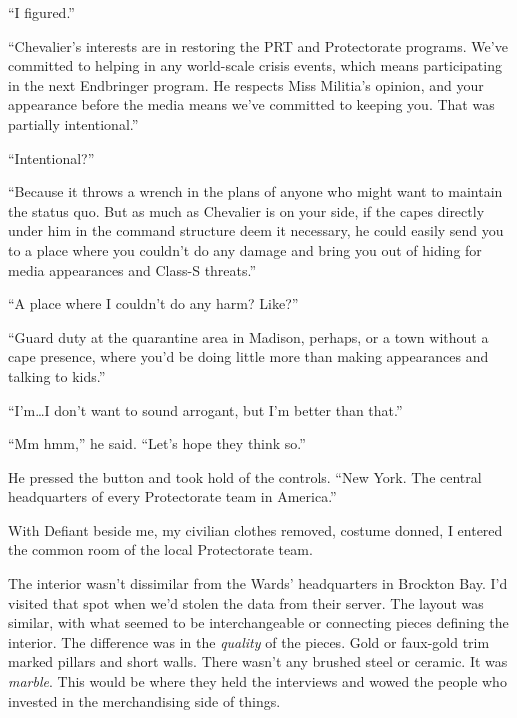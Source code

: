 ``I figured.''



``Chevalier's interests are in restoring the PRT and Protectorate programs.  We've committed to helping in any world-scale crisis events, which means participating in the next Endbringer program.  He respects Miss Militia's opinion, and your appearance before the media means we've committed to keeping you.  That was partially intentional.''



``Intentional?''



``Because it throws a wrench in the plans of anyone who might want to maintain the status quo.  But as much as Chevalier is on your side, if the capes directly under him in the command structure deem it necessary, he could easily send you to a place where you couldn't do any damage and bring you out of hiding for media appearances and Class-S threats.''



``A place where I couldn't do any harm?  Like?''



``Guard duty at the quarantine area in Madison, perhaps, or a town without a cape presence, where you'd be doing little more than making appearances and talking to kids.''



``I'm\ldots I don't want to sound arrogant, but I'm better than that.''



``Mm hmm,'' he said.  ``Let's hope they think so.''



He pressed the button and took hold of the controls.  ``New York.  The central headquarters of every Protectorate team in America.''



\sectionbreak



With Defiant beside me, my civilian clothes removed, costume donned, I entered the common room of the local Protectorate team.



The interior wasn't dissimilar from the Wards' headquarters in Brockton Bay.  I'd visited that spot when we'd stolen the data from their server.  The layout was similar, with what seemed to be interchangeable or connecting pieces defining the interior.  The difference was in the \emph{quality} of the pieces.  Gold or faux-gold trim marked pillars and short walls.  There wasn't any brushed steel or ceramic.  It was \emph{marble}.  This would be where they held the interviews and wowed the people who invested in the merchandising side of things.



